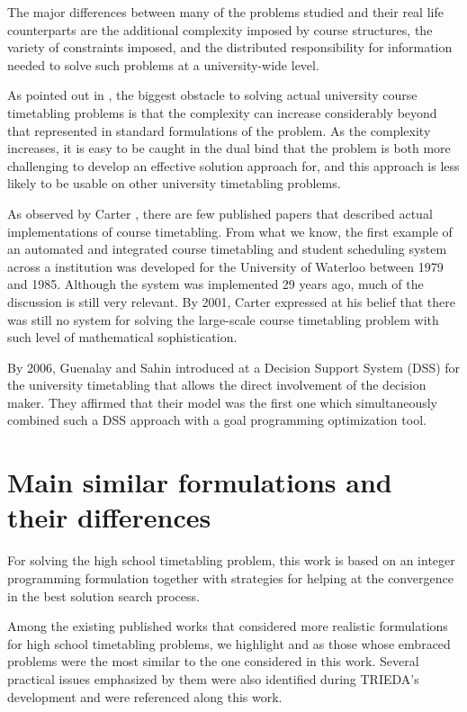 The major differences between many of the problems studied and their real life counterparts are the additional complexity imposed by course structures, the variety of constraints imposed, and the distributed responsibility for information needed to solve such problems at a university-wide level.

As pointed out in \cite{Murray2007}, the biggest obstacle to solving actual university course timetabling problems is that the complexity can increase considerably beyond that represented in standard formulations of the problem. As the complexity increases, it is easy to be caught in the dual bind that the problem is both more challenging to develop an effective solution approach for, and this approach is less likely to be usable on other university timetabling problems.

As observed by Carter \cite{Carter2001}, there are few published papers that described actual implementations of course timetabling. From what we know, the first example of an automated and integrated course timetabling and student scheduling system across a institution was developed for the University of Waterloo between 1979 and 1985. Although the system was implemented 29 years ago, much of the discussion is still very relevant. By 2001, Carter expressed at \cite{Carter2001} his belief that there was still no system for solving the large-scale course timetabling problem with such level of mathematical sophistication.

By 2006, Guenalay and Sahin introduced at \cite{Guenalay2006} a Decision Support System (DSS) for the university timetabling that allows the direct involvement of the decision maker. They affirmed that their model was the first one which simultaneously combined such a DSS approach with a goal programming optimization tool.



\section{Main similar formulations and their differences}

For solving the high school timetabling problem, this work is based on an integer programming formulation together with strategies for helping at the convergence in the best solution search process.

Among the existing published works that considered more realistic formulations for high school timetabling problems, we highlight \cite{Birbas2009} and \cite{Birbas2009} as those whose embraced problems were the most similar to the one considered in this work. Several practical issues emphasized by them were also identified during TRIEDA's development and were referenced along this work.

